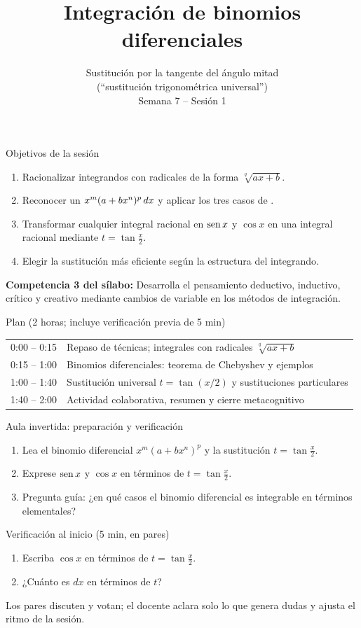 \documentclass[10pt,aspectratio=169]{beamer}
\title[Binomios y sustitución universal]{Integración de binomios diferenciales}
\subtitle{Sustitución por la tangente del ángulo mitad\\(``sustitución trigonométrica universal'')\\[2pt]\small Semana 7 -- Sesión 1}
\begin{document}
\begin{frame}
  \titlepage
\end{frame}

\begin{frame}{Objetivos de la sesión}
  \begin{enumerate}
    \item Racionalizar integrandos con radicales de la forma $\sqrt[q]{ax+b}$.
    \item Reconocer un  $x^m(a+bx^n)^p\,dx$ y aplicar los tres casos de .
    \item Transformar cualquier integral racional en $\operatorname{sen} x$ y $\cos x$ en una integral racional mediante $t=\tan\frac x2$.
    \item Elegir la sustitución más eficiente según la estructura del integrando.
  \end{enumerate}
  \vspace{1mm}
  {\small\textbf{Competencia 3 del sílabo:} Desarrolla el pensamiento deductivo, inductivo, crítico y creativo mediante cambios de variable en los métodos de integración.}
  \begin{block}{Plan (2 horas; incluye verificación previa de 5 min)}
    \begin{tabular}{ll}
      0:00 -- 0:15 & Repaso de técnicas; integrales con radicales $\sqrt[q]{ax+b}$\\
      0:15 -- 1:00 & Binomios diferenciales: teorema de Chebyshev y ejemplos\\
      1:00 -- 1:40 & Sustitución universal $t=\tan(x/2)$ y sustituciones particulares\\
      1:40 -- 2:00 & Actividad colaborativa, resumen y cierre metacognitivo
    \end{tabular}
  \end{block}
\end{frame}

\begin{frame}{Aula invertida: preparación y verificación}
  \small
  \begin{previa}
    \begin{enumerate}
      \item Lea el binomio diferencial $x^m(a+bx^n)^p$ y la sustitución $t=\tan\frac x2$.
      \item Exprese $\operatorname{sen} x$ y $\cos x$ en términos de $t=\tan\frac x2$.
      \item Pregunta guía: ¿en qué casos el binomio diferencial es integrable en términos elementales?
    \end{enumerate}
  \end{previa}
  \begin{block}{Verificación al inicio (5 min, en pares)}
    \begin{enumerate}
      \item Escriba $\cos x$ en términos de $t=\tan\frac x2$.
      \item ¿Cuánto es $dx$ en términos de $t$?
    \end{enumerate}
    Los pares discuten y votan; el docente aclara solo lo que genera dudas y ajusta el ritmo de la sesión.
  \end{block}
\end{frame}
\end{document}
